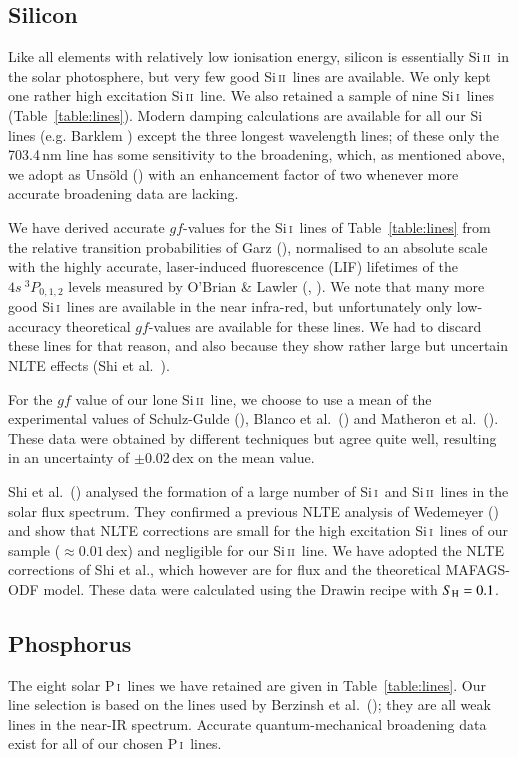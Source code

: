 \documentclass[traditabstract]{aa}
\newcommand{\altsii}{Si\,\textsc{i}}
\newcommand{\altsiii}{Si\,\textsc{ii}}
\newcommand{\altphosi}{P\,\textsc{i}}
\newcommand{\sii}{\altsii\ }
\newcommand{\siii}{\altsiii\ }
\newcommand{\phosi}{\altphosi\ }
\begin{document}
\subsection{Silicon}
Like all elements with relatively low ionisation energy, silicon is essentially \siii in the solar photosphere, but very few good \siii lines are available. We only kept one rather high excitation \siii line. We also retained a sample of nine \sii lines (Table~\ref{table:lines}).  Modern damping calculations are available for all our Si lines 
(e.g. Barklem \cite{bark2}) except the three longest wavelength lines; of these only the 703.4\,nm line has some sensitivity to the broadening, which, as mentioned above, we adopt as Uns\"old (\cite{unsold}) with an enhancement factor of two whenever more accurate broadening data are lacking.

We have derived accurate $gf$-values for the \sii lines of Table~\ref{table:lines} from the relative transition probabilities of Garz (\cite{garz}), normalised to an absolute scale with the highly accurate, laser-induced fluorescence (LIF) lifetimes of the $4s\ ^3P_{0,1,2}$ levels measured by O'Brian \& Lawler (\cite{obr1}, \cite{obr2}). We note that many more good \sii lines are available in the near infra-red, but unfortunately only low-accuracy theoretical $gf$-values are available for these lines.  We had to discard these lines for that reason, and also because they show rather large but uncertain NLTE effects (Shi et al.\ \cite{shi2}).

For the $gf$ value of our lone \siii line, we choose to use a mean of the experimental values of Schulz-Gulde (\cite{schu}), Blanco et al.\ (\cite{blan}) and Matheron et al.\ (\cite{math}).  These data were obtained by different techniques but agree quite well, resulting in an uncertainty of $\pm$0.02\,dex on the mean value.

Shi et al.\ (\cite{shi2}) analysed the formation of a large number of \sii and \siii lines in the solar flux spectrum. They confirmed a previous NLTE analysis of Wedemeyer (\cite{wede}) and show that NLTE corrections are small for the high excitation \sii lines of our sample ($\approx 0.01$\,dex) and negligible for our \siii line. We have adopted the NLTE corrections of Shi et al., which however are for flux and the theoretical MAFAGS-ODF model.  These data were calculated using the Drawin recipe with $S_{\rm H}=0.1$.

\subsection{Phosphorus}
The eight solar \phosi lines we have retained are given in Table~\ref{table:lines}. Our line selection is based on the lines used by Berzinsh et al.\ (\cite{ber}); they are all weak lines in the near-IR spectrum.  Accurate quantum-mechanical broadening data exist for all of our chosen \phosi lines.
\end{document}
